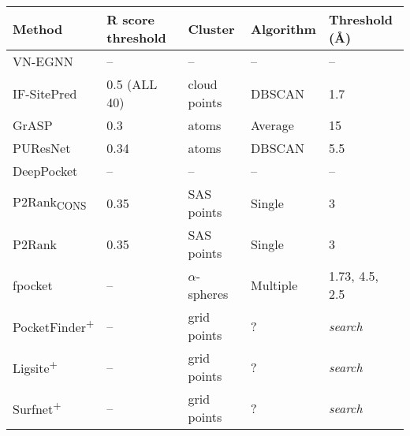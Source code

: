 \begin{landscape}
\begin{longtable}{|M{35mm}|M{45mm}|M{35mm}|M{35mm}|M{35mm}|}
\hline
\textbf{Method} & \textbf{R score threshold}  & \textbf{Cluster} & \textbf{Algorithm}   & \textbf{Threshold (\AA{})}\\ \hline
\endfirsthead
%
\endhead
%
VN-EGNN       & --                 & --            & --         & --         \\ \hline
IF-SitePred   & 0.5 (ALL 40)      & cloud points & DBSCAN    & 1.7       \\ \hline
GrASP         & 0.3               & atoms        & Average   & 15        \\ \hline
PUResNet      & 0.34              & atoms        & DBSCAN    & 5.5       \\ \hline
DeepPocket    & --                 & --            & --         & --         \\ \hline
P2Rank\textsubscript{CONS}    & 0.35              & SAS points   & Single    & 3         \\ \hline
P2Rank        & 0.35              & SAS points   & Single    & 3         \\ \hline
fpocket       & --                 & $\alpha$-spheres   & Multiple  & 1.73, 4.5, 2.5         \\ \hline
PocketFinder\textsuperscript{+} & --                 & grid points            & ?         & \textit{search}         \\ \hline
Ligsite\textsuperscript{+}      & --                 & grid points            & ?         & \textit{search} \\ \hline
Surfnet\textsuperscript{+}      & --                 & grid points            & ?         & \textit{search}      \\ \hline

\end{longtable}
\end{landscape}
